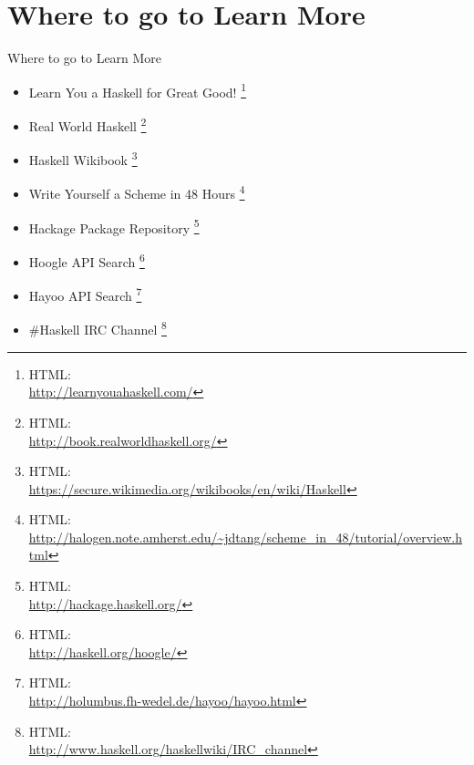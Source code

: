 \documentclass{beamer}                  %
\newcommand{\srule}{
	\rule{\textwidth}{1pt}\\
}
\newlength{\subsecwidth}
\newenvironment{slide}{
	\begin{frame} %
	\settowidth{\subsecwidth}{\insertsubsection} %
	\ifthenelse{\dimtest{\subsecwidth}{<}{1pt}}{ %
		\frametitle{\insertsection\\             %
		\vspace{-1ex}                            %
		\color{fore}\srule                       %
		\par                                     %
		\vspace{-3ex}                            %
		}
	}{                                           %
		\frametitle{\insertsection\ -- \insertsubsection\\ %
		\vspace{-1ex}                            %
		\color{fore}\srule                       %
		\par                                     %
		\vspace{-3ex}                            %
		}
	}
	\Large                                       %
}{
	\end{frame}
}
\newcommand{\titleslide}[1]{
	\section{#1}             %
	\begin{slide}
		\begin{center}
			\color{comments}
			\Huge            %
			#1               %
		\end{center}
	\end{slide}
}
\renewcommand{\thefootnote}{\fnsymbol{footnote}} %
\begin{document}

\renewcommand{\thefootnote}{\arabic{footnote}} %
\setcounter{footnote}{0}                       %
\titleslide{Where to go to Learn More}
\begin{slide}
  \begin{itemize}
    \normalsize

  \item Learn You a Haskell for Great Good!
    \footnote{
      HTML:\\ \url{http://learnyouahaskell.com/}
    }

  \item Real World Haskell
    \footnote{
      HTML:\\ \url{http://book.realworldhaskell.org/}
    }

  \item Haskell Wikibook
    \footnote{
      HTML:\\ \url{https://secure.wikimedia.org/wikibooks/en/wiki/Haskell}
    }

  \item Write Yourself a Scheme in 48 Hours
    \footnote{
      HTML:\\ \url{http://halogen.note.amherst.edu/~jdtang/scheme_in_48/tutorial/overview.html}
    }

  \end{itemize}
\end{slide}

\renewcommand{\thefootnote}{\arabic{footnote}} %
\setcounter{footnote}{0}                       %
\begin{slide}
  \begin{itemize}
    \normalsize

  \item Hackage Package Repository
    \footnote{
      HTML:\\ \url{http://hackage.haskell.org/}
    }

  \item Hoogle API Search
    \footnote{
      HTML:\\ \url{http://haskell.org/hoogle/}
    }

  \item Hayoo API Search
    \footnote{
      HTML:\\ \url{http://holumbus.fh-wedel.de/hayoo/hayoo.html}
    }

  \item \#Haskell IRC Channel
    \footnote{
      HTML:\\ \url{http://www.haskell.org/haskellwiki/IRC_channel}
    }

  \end{itemize}
\end{slide}
\end{document}
